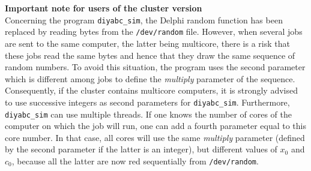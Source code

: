 \textbf{Important note for users of the cluster version}\\
Concerning the program \texttt{diyabc\_sim}, the Delphi \textsf{random} function has been replaced by reading bytes from the \texttt{/dev/random} file. However, when several jobs are sent to the same computer, the latter being multicore, there is a risk that these jobs read the same bytes and hence that they draw the same sequence of random numbers. To avoid this situation, the program uses the second parameter which is different among jobs to define the \emph{multiply} parameter of the sequence. Consequently, if the cluster contains multicore computers, it is strongly advised to use successive integers as second parameters for  \texttt{diyabc\_sim}. Furthermore, \texttt{diyabc\_sim} can use multiple threads. If one knows the number of cores of the computer on which the job will run, one can  add a fourth parameter equal to this core number. In that case, all cores will use the same \emph{multiply} parameter (defined by the second parameter if the latter is an integer), but different values of $x_0$ and $c_0$, because all the latter are now red sequentially from \texttt{/dev/random}.
 
